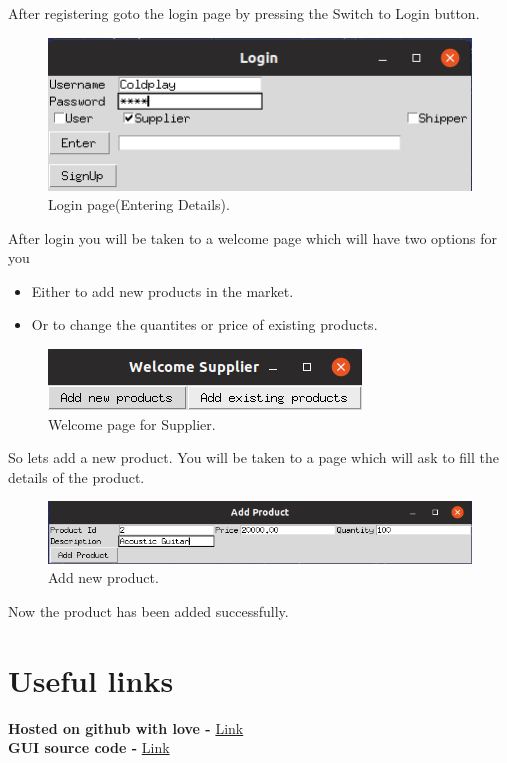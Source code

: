 \documentclass[a4paper,12pt]{article} %
\begin{document}
After registering goto the login page by pressing the Switch to Login button.
\begin{figure}[H]
    \centering
    \includegraphics[scale=0.5]{login2.png} 
    \caption{Login page(Entering Details).}
\end{figure}
After login you will be taken to a welcome page which will have two options for you 
\begin{itemize}
    \item Either to add new products in the market.
    \item Or to change the quantites or price of existing products. 
\end{itemize}
\begin{figure}[H]
    \centering
    \includegraphics[scale=0.5]{supp1.png} 
    \caption{Welcome page for Supplier.}
\end{figure}
So lets add a new product. You will be taken to a page which will ask to fill the details of the product.
\begin{figure}[H]
    \centering
    \includegraphics[scale=0.5]{supp2.png} 
    \caption{Add new product.}
\end{figure}
Now the product has been added successfully.

\newpage
\section{Useful links}
\begin{center}
\textbf{Hosted on github with love - } \href{https://github.com/nikhilyadv/DBMS-Lab-Project}{Link}\\
\textbf{GUI source code - } \href{https://github.com/nikhilyadv/DBMS-Lab-Project/GUI}{Link}
\end{center}
\newpage
\end{document}

